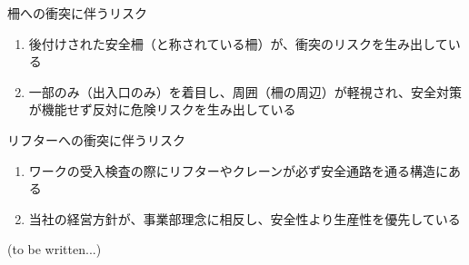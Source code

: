 \begin{Issues}{柵への衝突に伴うリスク}
\begin{enumerate}[label=\sarrow]
\item 後付けされた安全柵（と称されている柵）が、衝突のリスクを生み出している
\item 一部のみ（出入口のみ）を着目し、周囲（柵の周辺）が軽視され、安全対策が機能せず反対に危険リスクを生み出している
\end{enumerate}
\end{Issues}
\begin{Issues}{リフターへの衝突に伴うリスク}
\begin{enumerate}[label=\sarrow]
\item ワークの受入検査の際にリフターやクレーンが必ず安全通路を通る構造にある
\item 当社の経営方針が、事業部理念に相反し、安全性より生産性を優先している
\end{enumerate}
\end{Issues}


\clearpage
(to be written...)


